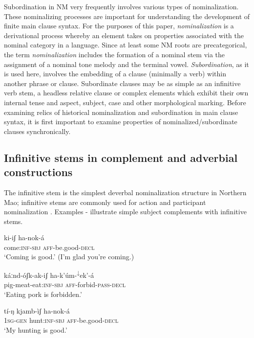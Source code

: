 \documentclass[output=paper]{langsci/langscibook}
\begin{document}
Subordination in NM very frequently involves various types of nominalization. These nominalizing processes are important for understanding the development of finite main clause syntax. For the purposes of this paper, \textit{nominalization} is a derivational process whereby an element takes on properties associated with the nominal category in a language. Since at least some NM roots are precategorical, the term \textit{nominalization} includes the formation of a nominal stem via the assignment of a nominal tone melody and the terminal vowel. \textit{Subordination}, as it is used here, involves the embedding of a clause (minimally a verb) within another phrase or clause. Subordinate clauses may be as simple as an infinitive verb stem, a headless relative clause or complex elements which exhibit their own internal tense and aspect, subject, case and other morphological marking. Before examining relics of historical nominalization and subordination in main clause syntax, it is first important to examine properties of nominalized/subordinate clauses synchronically.

\subsection{Infinitive stems in complement and adverbial constructions}\label{sec:mahland:2.1}

  The infinitive stem is the simplest deverbal nominalization structure in Northern Mao; infinitive stems are commonly used for action and participant nominalization \citep[222]{Ahland2012}. Examples - illustrate simple subject complements with infinitive stems. 

\ea\label{ex:mahland:33}
\gll ki-iʃ                 ha-nok-\'{a}   \\
come:\textsc{inf-sbj}     \textsc{aff}{}-be.good-\textsc{decl} \\
\glt `Coming is good.' (I'm glad you're coming.)
\z

\ea\label{ex:mahland:34}
\gll k\'{a}ːnd-\'{o}ʃk-ak-iʃ          ha-k'\'{u}m-\textsuperscript{↓}ek'-\'{a}\\
pig-meat-eat:\textsc{inf-sbj   aff}{}-forbid-\textsc{pass-decl} \\
\glt `Eating pork is forbidden.'
\z

\ea\label{ex:mahland:35}
\gll t\'{i}-ŋ         kjamb-\`{i}ʃ         ha-nok-\'{a}  \\
\textsc{1sg-gen}    hunt:\textsc{inf-sbj  aff}{}-be.good-\textsc{decl} \\
\glt `My hunting is good.'
\z
\end{document}
